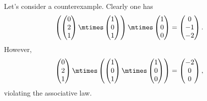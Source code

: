 \begin{solution}
    Let's consider a counterexample.
    Clearly one has
    \begin{equation}
        \left(\begin{pmatrix}
            0 \\ 2\\ 1
        \end{pmatrix}\mtimes \begin{pmatrix}
            1 \\ 0 \\ 1
        \end{pmatrix}\right)\mtimes
        \begin{pmatrix}
            1 \\ 0 \\ 0
        \end{pmatrix}=\begin{pmatrix}
            0 \\-1\\-2
        \end{pmatrix}.
    \end{equation}
    However,
    \begin{equation}
        \begin{pmatrix}
            0 \\ 2\\ 1
        \end{pmatrix}\mtimes \left(\begin{pmatrix}
            1 \\ 0 \\ 1
        \end{pmatrix}\mtimes
        \begin{pmatrix}
            1 \\ 0 \\ 0
        \end{pmatrix}\right)
        =\begin{pmatrix}
            -2 \\0\\0
        \end{pmatrix},
    \end{equation}
    violating the associative law.
\end{solution}

